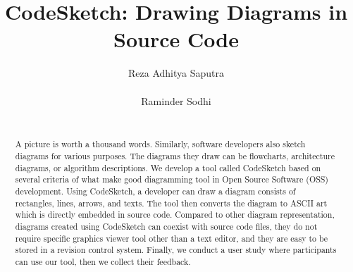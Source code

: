 \documentclass{sig-alternate}
\begin{document}
%

\title{CodeSketch: Drawing Diagrams in Source Code} 


\author{
\alignauthor
Reza Adhitya Saputra\\
       \\
\alignauthor
Raminder Sodhi\\
       \\
}


\maketitle
\begin{abstract}
\label{abstract}

A picture is worth a thousand words. Similarly, software developers also sketch diagrams for various purposes.  The diagrams they draw can be flowcharts, architecture diagrams, or algorithm descriptions. We develop a tool called CodeSketch based on several criteria of what make good diagramming tool in Open Source Software (OSS) development. Using CodeSketch, a developer can draw a diagram consists of rectangles, lines, arrows, and texts. The tool then converts the diagram to ASCII art which is directly embedded in source code. Compared to other diagram representation, diagrams created using CodeSketch can coexist with source code files, they do not require specific graphics viewer tool other than a text editor, and they are easy to be stored in a revision control system. Finally, we conduct a user study where participants can use our tool, then we collect their feedback.

\end{abstract}

%
\end{document}
